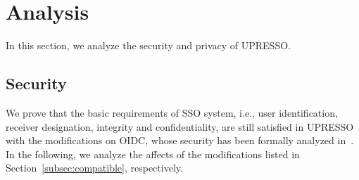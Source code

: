 \section{Analysis}
\label{sec:analysis}
In this section, we analyze the security and privacy of UPRESSO.

\subsection{Security}
\label{subsec:security}
We prove that the basic requirements of SSO system, i.e., user identification, receiver designation, integrity and confidentiality,  are still satisfied in UPRESSO with the modifications on OIDC, whose security  has been formally analyzed in~\cite{FettKS17}.
In the following, we analyze the affects of the modifications listed in Section~\ref{subsec:compatible}, respectively.

